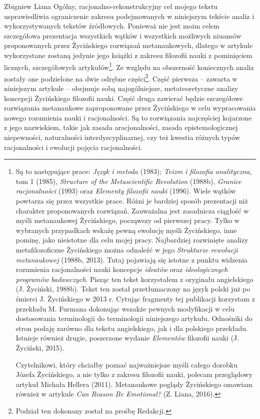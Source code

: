 \begin{artplenv}{Zbigniew Liana}
Ogólny, racjonalno-rekonstrukcyjny cel mojego tekstu usprawiedliwia ograniczenie zakresu podejmowanych w niniejszym
tekście analiz i wykorzystywanych tekstów źródłowych. Ponieważ nie jest moim celem szczegółowa prezentacja wszystkich
wątków i wszystkich możliwych niuansów proponowanych przez Życińskiego rozwiązań metanaukowych, dlatego w artykule
wykorzystane zostaną jedynie jego książki z zakresu filozofii nauki z pominięciem licznych, szczegółowych
artykułów\footnote{Są to następujące prace: \textit{Język i metoda} \label{ref:RND1LhiGh0y5p}(1983); \textit{Teizm i
		filozofia analityczna}, tom 1 \label{ref:RND68nQZEVcjZ}(1985), \textit{Structure of the Metascientific Revolution}
	\label{ref:RNDgXcIEkiEEw}(1988b), \textit{Granice racjonalności} \label{ref:RND9m82QoDque}(1993) oraz \textit{Elementy
		filozofii nauki }\label{ref:RNDBnf6pOKYn0}(1996). Wiele wątków powtarza się przez wszystkie prace. Różni je bardziej
	sposób prezentacji niż charakter proponowanych rozwiązań. Zauważalna jest zasadnicza ciągłość w myśli metanaukowej
	Życińskiego, począwszy od pierwszej pracy. Tylko w wybranych przypadkach wskażę pewną ewolucję myśli Życińskiego, inne
	pominę, jako nieistotne dla celu mojej pracy. Najbardziej rozwinięte analizy metafilozoficzne Życińskiego można
	odnaleźć w jego \textit{Strukturze rewolucji metanaukowej} \label{ref:RNDPOjzmhEMek}(1988b, 2013). Tutaj pojawiają się
	istotne z punktu widzenia rozumienia racjonalności nauki koncepcje \textit{ideatów} oraz \textit{ideologicznych programów
		badawczych}. Pisząc ten tekst korzystałem z oryginału angielskiego \label{ref:RNDFZPJ2Z2OCH}(J. Życiński, 1988b). Tekst
	ten został przetłumaczony na język polski już po śmierci J. Życińskiego w 2013 r. Cytując fragmenty tej publikacji
	korzystam z przekładu M. Furmana dokonując wszakże pewnych modyfikacji w celu dostosowania terminologii do terminologii
	niniejszego artykułu. Odnośniki do stron podaję zarówno dla tekstu angielskiego, jak i dla polskiego przekładu.
	Istnieje również drugie, poszerzone wydanie \textit{Elementów} filozofii nauki \label{ref:RNDL62LQXHrez}(J. Życiński,
	2015). \par Czytelnikowi, który chciałby poznać najważniejsze myśli całego dorobku Józefa Życińskiego, a nie tylko z
	zakresu filozofii nauki, polecam przeglądowy artykuł Michała Hellera \label{ref:RNDeScsQTkW9D}(2011). Metanaukowe
	poglądy Życińskiego omawiam również w artykule \textit{Can Reason Be Emotional?} \label{ref:RNDsr0gJlWoso}(Z. Liana,
	2016).}. Ze względu na obszerność koniecznych analiz zostały one podzielone na dwie odrębne części\footnote{Podział ten
	dokonany został na prośbę Redakcji.}. Część pierwsza -- zawarta w niniejszym artykule -- obejmuje sobą najogólniejsze,
metateoretyczne analizy koncepcji Życińskiego filozofii nauki. Część druga zawierać będzie szczegółowe rozwiązania
metanaukowe zaproponowane przez Życińskiego w celu wypracowania nowego rozumienia nauki i racjonalności. Są to
rozwiązania najczęściej kojarzone z jego nazwiskiem, takie jak zasada aracjonalności, zasada epistemologicznej
niepewności, naturalności interdyscyplinarnej, czy też kwestia różnych typów racjonalności i ewolucji pojęcia
racjonalności.


\end{artplenv}
